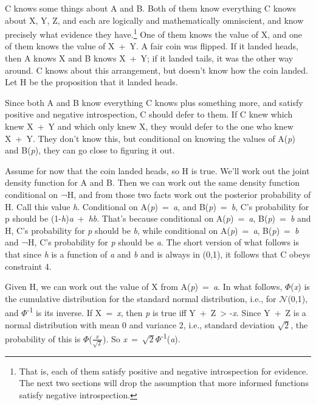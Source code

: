 \documentclass[
  11pt,
  letterpaper,
  DIV=11,
  numbers=noendperiod,
  twoside]{scrartcl}
\begin{document}
C knows some things about A and B. Both of them know everything C knows
about X, Y, Z, and each are logically and mathematically omniscient, and
know precisely what evidence they have.\footnote{That is, each of them
  satisfy positive and negative introspection for evidence. The next two
  sections will drop the assumption that more informed functions satisfy
  negative introspection.} One of them knows the value of X, and one of
them knows the value of X~+~Y. A fair coin was flipped. If it landed
heads, then A knows X and B knows X~+~Y; if it landed tails, it was the
other way around. C knows about this arrangement, but doesn't know how
the coin landed. Let H be the proposition that it landed heads.

Since both A and B know everything C knows plus something more, and
satisfy positive and negative introspection, C should defer to them. If
C knew which knew X~+~Y and which only knew X, they would defer to the
one who knew X~+~Y. They don't know this, but conditional on knowing the
values of A(\emph{p}) and B(\emph{p}), they can go close to figuring it
out.

Assume for now that the coin landed heads, so H is true. We'll work out
the joint density function for A and B. Then we can work out the same
density function conditional on ¬H, and from those two facts work out
the posterior probability of H. Call this value \emph{h}. Conditional on
A(\emph{p})~=~\emph{a}, and B(\emph{p})~=~\emph{b}, C's probability for
p should be (1-\emph{h})\emph{a}~+~\emph{hb}. That's because conditional
on A(\emph{p})~=~\emph{a}, B(\emph{p})~=~\emph{b} and H, C's probability
for \emph{p} should be \emph{b}, while conditional on
A(\emph{p})~=~\emph{a}, B(\emph{p})~=~\emph{b} and ¬H, C's probability
for \emph{p} should be \emph{a}. The short version of what follows is
that since \emph{h} is a function of \emph{a} and \emph{b} and is always
in (0,1), it follows that C obeys constraint 4.

Given H, we can work out the value of X from A(\emph{p})~=~\emph{a}. In
what follows, \(\Phi\)(\emph{x}) is the cumulative distribution for the
standard normal distribution, i.e., for \(\mathcal{N}\)(0,1), and
\(\Phi\)\textsuperscript{-1} is its inverse. If X~=~\emph{x}, then
\emph{p} is true iff Y~+~Z~\textgreater{} -\emph{x}. Since Y~+~Z is a
normal distribution with mean 0 and variance 2, i.e., standard deviation
\(\sqrt{2}\), the probability of this is
\(\Phi\)(\(\frac{x}{\sqrt{2}}\)). So
\emph{x}~=~\(\sqrt{2}\Phi\)\textsuperscript{-1}(\emph{a}).
\end{document}

